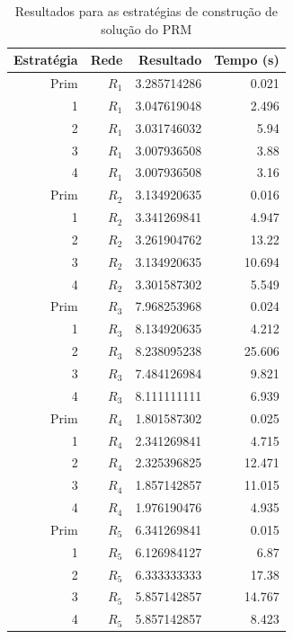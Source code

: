 \begin{table}[!htbp]
	\centering
	\caption{Resultados para as estratégias de construção de solução do PRM}
	\label{tab_exp2_estrategias}
	\begin{tabular}{rrrr}
		Estratégia & Rede & Resultado   & Tempo (s)    \\ \hline
		Prim       & $R_1$   & 3.285714286 & 0.021     \\
		1          & $R_1$   & 3.047619048 & 2.496     \\
		2          & $R_1$   & 3.031746032 & 5.94      \\
		\rowcolor{table-green} 
		3          & $R_1$   & 3.007936508 & 3.88      \\
		\rowcolor{table-green} 
		4          & $R_1$   & 3.007936508 & 3.16      \\ \hline
		Prim       & $R_2$   & 3.134920635 & 0.016     \\
		1          & $R_2$   & 3.341269841 & 4.947     \\
		2          & $R_2$   & 3.261904762 & 13.22     \\
		\rowcolor{table-green} 
		3          & $R_2$   & 3.134920635 & 10.694    \\
		4          & $R_2$   & 3.301587302 & 5.549     \\ \hline
		Prim       & $R_3$   & 7.968253968 & 0.024     \\
		1          & $R_3$   & 8.134920635 & 4.212     \\
		2          & $R_3$   & 8.238095238 & 25.606    \\
		\rowcolor{table-green} 
		3          & $R_3$   & 7.484126984 & 9.821     \\
		4          & $R_3$   & 8.111111111 & 6.939     \\ \hline
		Prim       & $R_4$   & 1.801587302 & 0.025     \\
		1          & $R_4$   & 2.341269841 & 4.715     \\
		2          & $R_4$   & 2.325396825 & 12.471    \\
		\rowcolor{table-green} 
		3          & $R_4$   & 1.857142857 & 11.015    \\
		4          & $R_4$   & 1.976190476 & 4.935     \\ \hline
		Prim       & $R_5$   & 6.341269841 & 0.015     \\
		1          & $R_5$   & 6.126984127 & 6.87      \\
		2          & $R_5$   & 6.333333333 & 17.38     \\
		\rowcolor{table-green} 
		3          & $R_5$   & 5.857142857 & 14.767    \\
		\rowcolor{table-green} 
		4          & $R_5$   & 5.857142857 & 8.423     \\ \hline
	\end{tabular}
\end{table}

